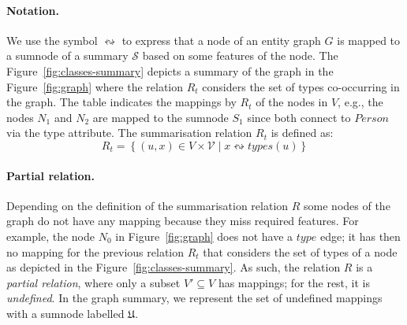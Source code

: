 \paragraph{Notation.}

We use the symbol $\leftrightsquigarrow$ to express that a node of an entity graph $G$ is mapped to a sumnode of a summary $\mathcal{S}$ based on some features of the node.
The Figure~\ref{fig:classes-summary} depicts a summary of the graph in the Figure~\ref{fig:graph} where the relation $R_t$ considers the set of types co-occurring in the graph. The table indicates the mappings by $R_t$ of the nodes in $V$, e.g., the nodes $N_1$ and $N_2$ are mapped to the sumnode $S_1$ since both connect to $Person$ via the type attribute. The summarisation relation $R_t$ is defined as:
$$
R_t = \left\lbrace (u, x) \in V \times \mathcal{V} \mid x \leftrightsquigarrow types(u) \right\rbrace
$$


\paragraph{Partial relation.}

Depending on the definition of the summarisation relation $R$ some nodes of the graph do not have any mapping because they miss required features. For example, the node $N_0$ in Figure~\ref{fig:graph} does not have a $type$ edge; it has then no mapping for the previous relation $R_t$ that considers the set of types of a node as depicted in the Figure~\ref{fig:classes-summary}. As such, the relation $R$ is a \emph{partial relation}, where only a subset $V' \subseteq V$ has mappings; for the rest, it is \emph{undefined}. In the graph summary, we represent the set of undefined mappings with a sumnode labelled $\mathfrak{U}$.

